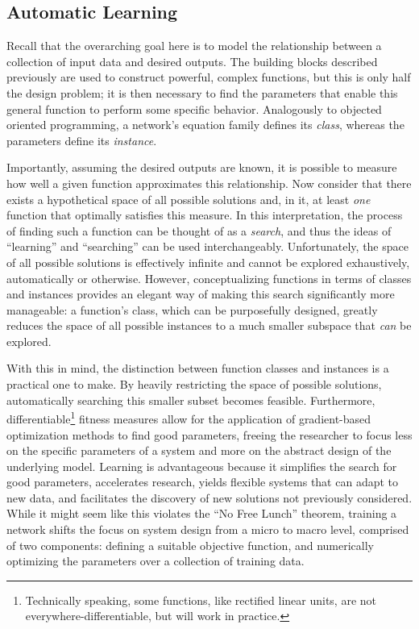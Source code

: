 \subsection{Automatic Learning}
\label{subsec:learning}

Recall that the overarching goal here is to model the relationship between a collection of input data and desired outputs.
The building blocks described previously are used to construct powerful, complex functions, but this is only half the design problem;
it is then necessary to find the parameters that enable this general function to perform some specific behavior.
Analogously to objected oriented programming, a network's equation family defines its \emph{class}, whereas the parameters define its \emph{instance}.

Importantly, assuming the desired outputs are known, it is possible to measure how well a given function approximates this relationship.
Now consider that there exists a hypothetical space of all possible solutions and, in it, at least \emph{one} function that optimally satisfies this measure.
In this interpretation, the process of finding such a function can be thought of as a \emph{search}, and thus the ideas of ``learning'' and ``searching'' can be used interchangeably.
Unfortunately, the space of all possible solutions is effectively infinite and cannot be explored exhaustively, automatically or otherwise.
However, conceptualizing functions in terms of classes and instances provides an elegant way of making this search significantly more manageable:
a function's class, which can be purposefully designed, greatly reduces the space of all possible instances to a much smaller subspace that \emph{can} be explored.

With this in mind, the distinction between function classes and instances is a practical one to make.
By heavily restricting the space of possible solutions, automatically searching this smaller subset becomes feasible.
Furthermore, differentiable\footnote{Technically speaking, some functions, like rectified linear units, are not everywhere-differentiable, but will work in practice.} fitness measures allow for the application of gradient-based optimization methods to find good parameters, freeing the researcher to focus less on the specific parameters of a system and more on the abstract design of the underlying model.
Learning is advantageous because it simplifies the search for good parameters, accelerates research, yields flexible systems that can adapt to new data, and facilitates the discovery of new solutions not previously considered.
While it might seem like this violates the ``No Free Lunch'' theorem, training a network shifts the focus on system design from a micro to macro level, comprised of two components: defining a suitable objective function, and numerically optimizing the parameters over a collection of training data.


